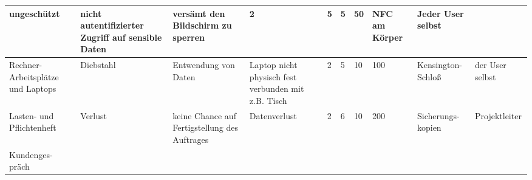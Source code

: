\begin{center}
{\begin{tabular}{|p{1.5cm}|p{1.5cm}|p{1.7cm}|p{1.5cm}|p{0.25cm}|p{0.25cm}|p{0.25cm}|p{0.5cm}|p{1.5cm}|p{1.5cm}|}
{
	ungesch\"{u}tzt
}&

{
	nicht autentifizierter Zugriff auf sensible Daten
}&

{
	vers\"{a}mt den Bildschirm zu sperren
}&

{
	2
}&

{
	5
}&

{
	5
}&

{
	50
}&

{
	NFC am K\"{o}rper
}&

{
	Jeder User selbst
}\\ \hline
%
%
{
	Rechner-Arbeitspl\"{a}tze und Laptops
}&

{
	Diebstahl
}&

{
	Entwendung von Daten
}&

{
	Laptop nicht physisch fest verbunden mit z.B. Tisch
}&

{
	2
}&

{
	5
}&

{
	10
}&

{
	100
}&

{
	Kensington-Schlo\ss{}
}&

{
	der User selbst
}\\ \hline
%
%
{
	Lasten- und Pflichtenheft
}&

{
	Verlust
}&

{
	keine Chance auf Fertigstellung des Auftrages
}&

{
	Datenverlust
}&

{
	2
}&

{
	6
}&

{
	10
}&

{
	200
}&

{
	Sicherungs- \newline kopien
}&

{
	Projektleiter
}\\ \hline
%
%
{
	Kundenges-\newline pr\"{a}ch
}&


\end{tabular}}
\end{center}
